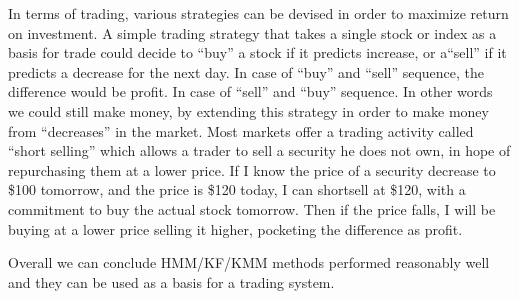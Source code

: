 In terms of trading, various strategies can be devised in order to maximize
return on investment. A simple trading strategy that takes a single stock or
index as a basis for trade could decide to ``buy'' a stock if it predicts
increase, or a``sell'' if it predicts a decrease for the next day. In case of
``buy'' and ``sell'' sequence, the difference would be profit. In case of
``sell'' and ``buy'' sequence. In other words we could still make money, by
extending this strategy in order to make money from ``decreases'' in the
market. Most markets offer a trading activity called ``short selling'' which
allows a trader to sell a security he does not own, in hope of repurchasing them
at a lower price. If I know the price of a security decrease to \$100 tomorrow,
and the price is \$120 today, I can shortsell at \$120, with a commitment to buy
the actual stock tomorrow. Then if the price falls, I will be buying at a lower
price selling it higher, pocketing the difference as profit.

Overall we can conclude HMM/KF/KMM methods performed reasonably well and they
can be used as a basis for a trading system.
